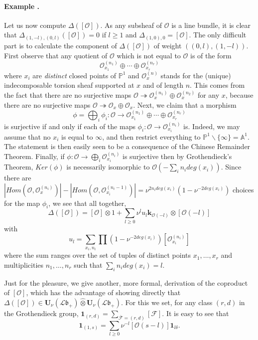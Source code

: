 \documentclass[a4paper,10pt]{amsart}
\def\U{\mathbf{U}}
\def\O{\mathcal{O}}
\def\bo{\mathfrak{b}}
\numberwithin{equation}{section}
\begin{document}
{\paragraph{\textbf{Example \thetheo.}} Let us now compute $\Delta([\O])$. As any subsheaf of $\O$ is a line bundle, it is clear that
$\Delta_{(1,-l),(0,l)}([\O])=0$ if $l \geq 1$ and $\Delta_{(1,0),0}=[\O]$. The only difficult part is to calculate the component of $\Delta([\O])$ of weight $((0,l),(1,-l))$.
First observe that any quotient of $\O$ which is not equal to $\O$ is of the form
$$\O_{x_1}^{(n_1)} \oplus \cdots \oplus \O_{x_r}^{(n_r)}$$
where $x_i$ are \textit{distinct} closed points of $\mathbb{P}^1$ and $\O_x^{(n)}$ stands for the (unique) indecomposable torsion sheaf supported at $x$ and of length $n$. This comes from the fact that there are no surjective maps $\O \twoheadrightarrow \O_x^{(n_1)} \oplus \O_x^{(n_2)}$ for any $x$, because there are no surjective maps $\O \twoheadrightarrow \O_x \oplus \O_x$. Next, we claim that a morphism
$$\phi=\bigoplus_i \phi_i: \O \to \O_{x_1}^{(n_1)} \oplus \cdots \oplus \O_{x_r}^{(n_r)}$$
is surjective if and only if each of the maps $\phi_i: \O \to \O_{x_i}^{(n_i)}$ is. Indeed, we may assume that no $x_i$ is equal to $\infty$, and then restrict everything to $\mathbb{P}^1\backslash \{\infty\}=\mathbb{A}^1$. The statement is then easily seen to be a consequence of the Chinese Remainder Theorem. Finally, if $\phi: \O \to \bigoplus_i \O_{x_i}^{(n_i)}$ is surjective then by Grothendieck's Theorem, $Ker(\phi)$ is necessarily isomorphic to $\O(-\sum_i n_i deg(x_i))$. Since there are $ |Hom(\O,\O_x^{(n_i)})|-|Hom(\O,\O_{x_i}^{(n_i-1)})|=\nu^{2n_ideg(x_i)}(1-\nu^{-2deg(x_i)})$ choices for the map $\phi_i$, we see that all together,
\begin{equation}
\Delta([\O])= [\O]\otimes 1 +\sum_{l \geq 0} \nu^{l} u_l\mathbf{k}_{\O(-l)} \otimes [\O(-l)]
\end{equation}
with
\begin{equation}\label{E:formulathetal}
u_l=\sum_{x_i,n_i} \prod(1-\nu^{-2deg(x_i)}) [\O_{x_i}^{(n_i)}]
\end{equation}
where the sum ranges over the set of tuples of distinct points $x_1, \ldots, x_r$ and multiplicities $n_1, \ldots, n_r$ such that $\sum_i n_i deg(x_i)=l$.

\vspace{.1in}

Just for the pleasure, we give another, more formal, derivation of the coproduct of $[\O]$, which has the advantage of showing directly that $\Delta([\O]) \in \U_{\nu}(\mathcal{L}\bo_+) \widehat{\otimes} \U_{\nu}(\mathcal{L}\bo_+)$.
For this we set, for any class $(r,d)$ in the Grothendieck group, $\mathbf{1}_{(r,d)}=\sum_{\overline{\mathcal{F}}=(r,d)} [\mathcal{F}].$
It is easy to see that
\begin{equation}\label{E:un10}
\mathbf{1}_{(1,s)}=\sum_{l \geq 0} \nu^{-l} [\O(s-l)]\mathbf{1}_{l\delta}.
\end{equation}

}
\end{document}
